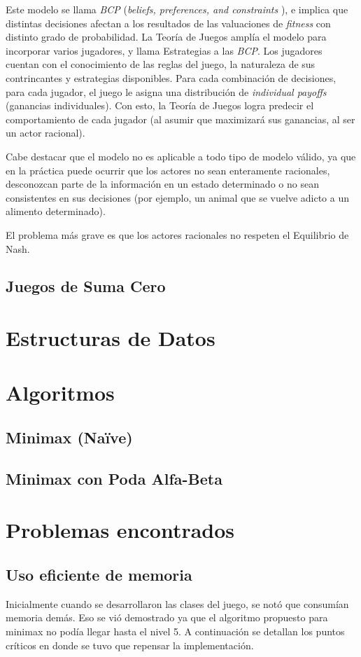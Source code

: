 \documentclass[10pt,a4paper,notitlepage,draft]{article}
\begin{document}
Este modelo se llama \textit{BCP} (\textit{beliefs, preferences, and constraints} \cite[p. 3]{bbs}), e implica que distintas decisiones afectan a los resultados de las valuaciones de \textit{fitness} con distinto grado de probabilidad. La Teoría de Juegos amplía el modelo para incorporar varios jugadores, y llama Estrategias a las \textit{BCP}. Los jugadores cuentan con el conocimiento de las reglas del juego, la naturaleza de sus contrincantes y estrategias disponibles. Para cada combinación de decisiones, para cada jugador, el juego le asigna una distribución de \textit{individual payoffs} (ganancias individuales). Con esto, la Teoría de Juegos logra predecir el comportamiento de cada jugador (al asumir que maximizará sus ganancias, al ser un actor racional). \cite[p. 8]{bbs}

Cabe destacar que el modelo no es aplicable a todo tipo de modelo válido, ya que en la práctica puede ocurrir que los actores no sean enteramente racionales, desconozcan parte de la información en un estado determinado o no sean consistentes en sus decisiones (por ejemplo, un animal que se vuelve adicto a un alimento determinado). \cite[p. 9 - 11, ]{bbs}

El problema más grave es que los actores racionales no respeten el Equilibrio de Nash. \cite{ram}


\subsection{Juegos de Suma Cero}
\section{Estructuras de Datos}
\section{Algoritmos}
\subsection{Minimax (Na\"ive)}
\subsection{Minimax con Poda Alfa-Beta}
\section{Problemas encontrados}
\subsection{Uso eficiente de memoria}
  Inicialmente cuando se desarrollaron las clases del juego, se notó que consumían memoria demás.
  Eso se vió demostrado ya que el algoritmo propuesto para minimax no podía llegar hasta el nivel 5.
  A continuación se detallan los puntos críticos en donde se tuvo que repensar la implementación.
\end{document}
